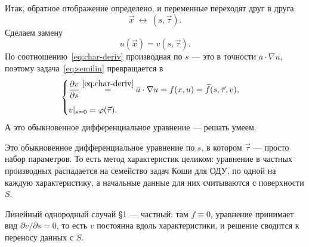 Итак, обратное отображение определено, и переменные переходят друг в друга:
\[
  \vec x \ \longleftrightarrow\ (s, \vec\tau) .
\]
Сделаем замену
\[
  u(\vec x) = v(s, \vec\tau) .
\]
По соотношению~\eqref{eq:char-deriv} производная по $s$ — это в точности
$\bar a \cdot \nabla u$, поэтому задача~\eqref{eq:semilin} превращается в
\[
  \begin{cases}
    \dfrac{\partial v}{\partial s}
      \overset{\eqref{eq:char-deriv}}{=} \bar a \cdot \nabla u
      = f(x, u) = \widetilde f(s, \vec\tau, v), \\[10pt]
    v|_{s=0} = \varphi(\vec\tau) .
  \end{cases}
\]
А это обыкновенное дифференциальное уравнение — решать умеем.

\begin{idea}
Это обыкновенное дифференциальное уравнение по $s$, в котором $\vec\tau$ —
просто набор параметров. То есть метод характеристик целиком: уравнение в
частных производных распадается на семейство задач Коши для ОДУ, по одной на
каждую характеристику, а начальные данные для них считываются с поверхности
$S$.

\medskip
Линейный однородный случай \S1 — частный: там $f \equiv 0$, уравнение
принимает вид $\partial v / \partial s = 0$, то есть $v$ постоянна вдоль
характеристики, и решение сводится к переносу данных с $S$.
\end{idea}
